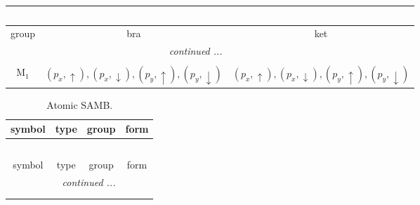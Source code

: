 \documentclass[fleqn,10pt,landscape]{article}
\begin{document}
\begin{itemize}
\begin{center}
\begin{longtable}{c|c|c}
\multicolumn{2}{l}{\tablename\ \thetable{}} \\
 \hline \hline
group & bra & ket \\ \hline \endhead

 \hline \hline
\multicolumn{2}{r}{\footnotesize\it continued ...} \\ \endfoot

 \hline \hline
\multicolumn{2}{r}{} \\ \endlastfoot

M$_{1}$ & $(p_{x},\uparrow), (p_{x},\downarrow), (p_{y},\uparrow), (p_{y},\downarrow)$ & $(p_{x},\uparrow), (p_{x},\downarrow), (p_{y},\uparrow), (p_{y},\downarrow)$ \\
\end{longtable}
\end{center}
\begin{center}
\renewcommand{\arraystretch}{1.3}
\begin{longtable}{c|c|c|c}
\caption{Atomic SAMB.}
 \\
 \hline \hline
symbol & type & group & form \\ \hline \endfirsthead

\multicolumn{3}{l}{\tablename\ \thetable{}} \\
 \hline \hline
symbol & type & group & form \\ \hline \endhead

 \hline \hline
\multicolumn{3}{r}{\footnotesize\it continued ...} \\ \endfoot

 \hline \hline
\multicolumn{3}{r}{} \\ \endlastfoot


\end{longtable}
\end{center}
\end{itemize}
\end{document}
